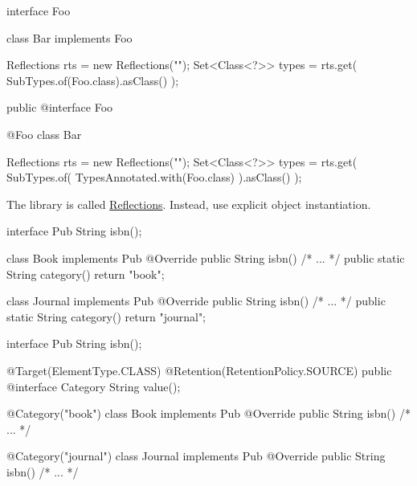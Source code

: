 \documentclass{article}
\begin{document}

\begin{pptWide}{2}
{\small\begin{ffcode}
interface Foo {}

class Bar implements Foo {}

Reflections rts =
  new Reflections("");
Set<Class<?>> types = rts.get(
  SubTypes.of(Foo.class).asClass()
);
\end{ffcode}
}
\par\columnbreak\par
{\small\begin{ffcode}
public @interface Foo {}

@Foo
class Bar {}

Reflections rts =
  new Reflections("");
Set<Class<?>> types = rts.get(
  SubTypes.of(
    TypesAnnotated.with(Foo.class)
  ).asClass()
);
\end{ffcode}
}
\end{pptWide}
\par
The library is called \href{https://github.com/ronmamo/reflections}{Reflections}.
Instead, use explicit object instantiation.
\plush{}


\begin{pptWide}{2}
{\scriptsize\begin{ffcode}
interface Pub
  String isbn();

class Book implements Pub
  @Override public String isbn()
    /* ... */
  public static String category()
    return "book";

class Journal implements Pub
  @Override public String isbn()
    /* ... */
  public static String category()
    return "journal";
\end{ffcode}
}
\par\columnbreak\par
{\scriptsize\begin{ffcode}
interface Pub
  String isbn();

@Target(ElementType.CLASS)
@Retention(RetentionPolicy.SOURCE)
public @interface Category
  String value();

@Category("book")
class Book implements Pub
  @Override public String isbn()
    /* ... */

@Category("journal")
class Journal implements Pub
  @Override public String isbn()
    /* ... */
\end{ffcode}
}
\end{pptWide}
\par
\plush{}
\end{document}
